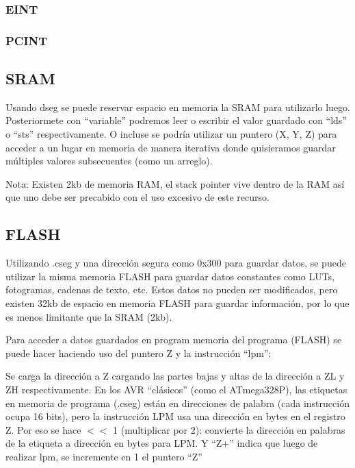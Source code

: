     \subsubsection{EINT}


    \subsubsection{PCINT}

\subsection{SRAM}


Usando dseg se puede reservar espacio en memoria la SRAM para utilizarlo luego. Posteriormete con ``variable'' podremos leer o escribir el valor guardado con ``lds'' o ``sts'' respectivamente. O incluse se podría utilizar un puntero (X, Y, Z) para acceder a un lugar en memoria de manera iterativa donde quisieramos guardar múltiples valores subsecuentes (como un arreglo). 

Nota: Existen 2kb de memoria RAM, el stack pointer vive dentro de la RAM así que uno debe ser precabido con el uso excesivo de este recurso.

\subsection{FLASH}

Utilizando .cseg y una dirección segura como 0x300 para guardar datos, se puede utilizar la misma memoria FLASH para guardar datos constantes como LUTs, fotogramas, cadenas de texto, etc. Estos datos no pueden ser modificados, pero existen 32kb de espacio en memoria FLASH para guardar información, por lo que es menos limitante que la SRAM (2kb).

Para acceder a datos guardados en program memoria del programa (FLASH) se puede hacer haciendo uso del puntero Z y la instrucción ``lpm'':


Se carga la dirección a Z cargando las partes bajas y altas de la dirección a ZL y ZH respectivamente. En los AVR  ``clásicos'' (como el ATmega328P), las etiquetas en memoria de programa (.cseg) están en direcciones de palabra (cada instrucción ocupa 16 bits), pero la instrucción LPM usa una dirección en bytes en el registro Z. Por eso se hace $<$$<$ 1 (multiplicar por 2): convierte la dirección en palabras de la etiqueta a dirección en bytes para LPM. Y ``Z+'' indica que luego de realizar lpm, se incremente en 1 el puntero ``Z''

